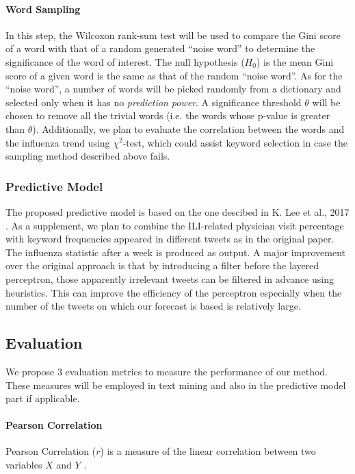 \documentclass[12pt, oneside]{article}
\begin{document}
\paragraph{Word Sampling}
In this step, the Wilcoxon rank-sum test \cite{WilcoxonRankSum} will be used to compare the Gini score of a word with that of a random generated ``noise word'' to determine
the significance of the word of interest. The null hypothesis ($H_0$) is the mean Gini score of a given word is the same as that of the random ``noise word''.
As for the ``noise word'', a number of words will be picked randomly from a dictionary and selected only when it has no \textit{prediction power}.
A significance threshold $\theta$ will be chosen to remove all the trivial words (i.e. the words whose p-value is greater than $\theta$).
Additionally, we plan to evaluate the correlation between the words and the influenza trend using $\chi^2$-test, which could assist keyword selection in case
the sampling method described above fails.


\subsubsection{Predictive Model}

The proposed predictive model is based on the one descibed in K. Lee et al., 2017 \cite{lee2017forecasting}. As a supplement, we plan to combine the ILI-related physician visit
percentage with keyword frequencies appeared in different tweets as in the original paper. The influenza statistic after a week is produced as output.
A major improvement over the original approach is that by introducing a filter before the layered perceptron, those apparently irrelevant tweets can be filtered
in advance using heuristics. This can improve the efficiency of the perceptron especially when the number of the tweets on which our forecast is based is relatively large.

\subsection{Evaluation}
\label{subsec:evaluation}

We propose 3 evaluation metrics to measure the performance of our method. These measures will be employed in text mining and also in the predictive model part if applicable.

\paragraph{Pearson Correlation}
Pearson Correlation ($r$) is a measure of the linear correlation between two variables $X$ and $Y$ \cite{wiki:correlation}.
\end{document}
